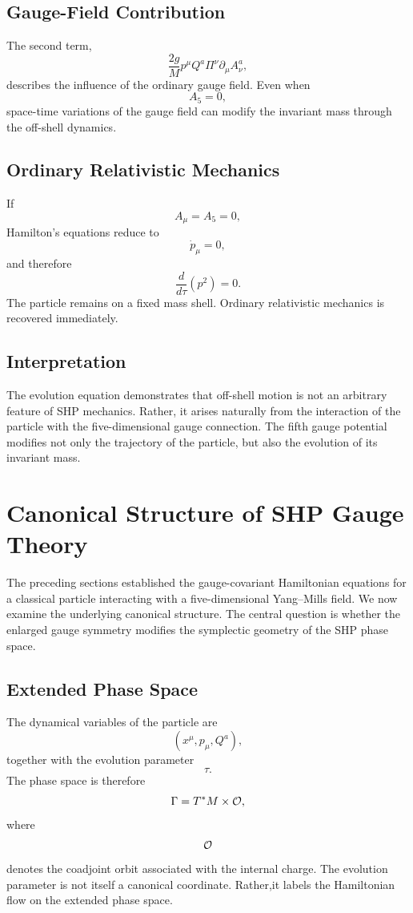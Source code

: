 \subsection{Gauge-Field Contribution}
The second term,
\[\frac{2g}{M}p^\mu Q^a\Pi^\nu\partial_\mu A_\nu^a,\]
describes the influence of the ordinary gauge field.
Even when
\[A_5=0,\]
space-time variations of the gauge field can modify the invariant mass
through the off-shell dynamics.
\subsection{Ordinary Relativistic Mechanics}
If
\[A_\mu=A_5=0,\]
Hamilton's equations reduce to
\[\dot p_\mu=0,\]
and therefore
\[\boxed{\frac{d}{d\tau}(p^2)=0.}\]
The particle remains on a fixed mass shell.
Ordinary relativistic mechanics is recovered immediately.
\subsection{Interpretation}
The evolution equation demonstrates that off-shell motion is not an
arbitrary feature of SHP mechanics.
Rather,
it arises naturally from the interaction of the particle with the
five-dimensional gauge connection.
The fifth gauge potential modifies not only the trajectory of the
particle,
but also the evolution of its invariant mass.
\section{Canonical Structure of SHP Gauge Theory}
The preceding sections established the gauge-covariant Hamiltonian
equations for a classical particle interacting with a five-dimensional
Yang--Mills field. We now examine the underlying canonical structure.
The central question is whether the enlarged gauge symmetry modifies the
symplectic geometry of the SHP phase space.
\subsection{Extended Phase Space}
The dynamical variables of the particle are
\[(x^\mu,p_\mu,Q^a),\]
together with the evolution parameter
\[\tau.\]
The phase space is therefore
\[\Gamma=T^*M\times{\cal O},\]
where
\[{\cal O}\]
denotes the coadjoint orbit associated with the internal charge.
The evolution parameter is not itself a canonical coordinate.
Rather,it labels the Hamiltonian flow on the extended phase space.
